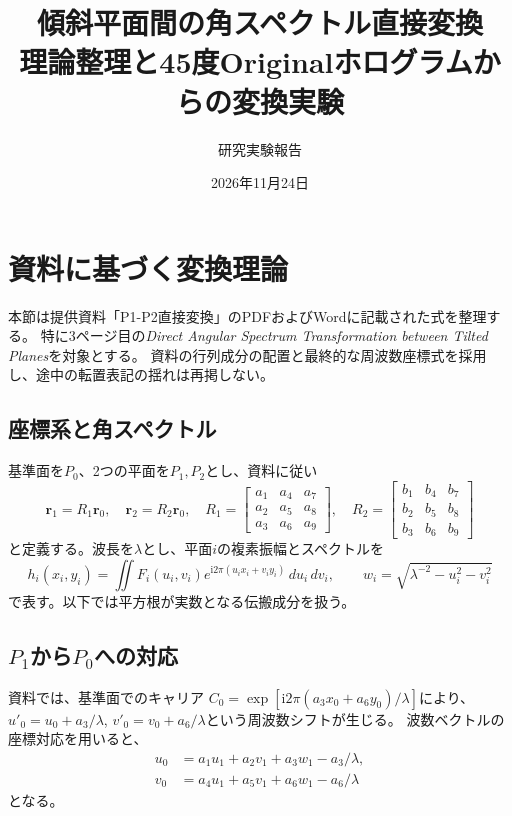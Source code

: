 \documentclass[a4paper,10pt]{ltjsarticle}
\title{傾斜平面間の角スペクトル直接変換\\理論整理と45度Originalホログラムからの変換実験}
\author{研究実験報告}
\date{2026年11月24日}
\begin{document}
\maketitle\small
\section{資料に基づく変換理論}
本節は提供資料「P1-P2直接変換」のPDFおよびWordに記載された式を整理する。
特に3ページ目の\textit{Direct Angular Spectrum Transformation between Tilted Planes}を対象とする。
資料の行列成分の配置と最終的な周波数座標式を採用し、途中の転置表記の揺れは再掲しない。

\subsection{座標系と角スペクトル}
基準面を$P_0$、2つの平面を$P_1,P_2$とし、資料に従い
\begin{equation}
 \boldsymbol r_1=R_1\boldsymbol r_0,\quad
 \boldsymbol r_2=R_2\boldsymbol r_0,\quad
 R_1=\begin{bmatrix}a_1&a_4&a_7\\a_2&a_5&a_8\\a_3&a_6&a_9\end{bmatrix},\quad
 R_2=\begin{bmatrix}b_1&b_4&b_7\\b_2&b_5&b_8\\b_3&b_6&b_9\end{bmatrix}
\end{equation}
と定義する。波長を$\lambda$とし、平面$i$の複素振幅とスペクトルを
\begin{equation}
 h_i(x_i,y_i)=\iint F_i(u_i,v_i)e^{\mathrm i2\pi(u_ix_i+v_iy_i)}\,du_i\,dv_i,
 \qquad w_i=\sqrt{\lambda^{-2}-u_i^2-v_i^2}
\end{equation}
で表す。以下では平方根が実数となる伝搬成分を扱う。

\subsection{$P_1$から$P_0$への対応}
資料では、基準面でのキャリア
$C_0=\exp[\mathrm i2\pi(a_3x_0+a_6y_0)/\lambda]$により、
$u'_0=u_0+a_3/\lambda$, $v'_0=v_0+a_6/\lambda$という周波数シフトが生じる。
波数ベクトルの座標対応を用いると、
\begin{align}
 u_0&=a_1u_1+a_2v_1+a_3w_1-a_3/\lambda,\\
 v_0&=a_4u_1+a_5v_1+a_6w_1-a_6/\lambda
\end{align}
となる。
\end{document}
